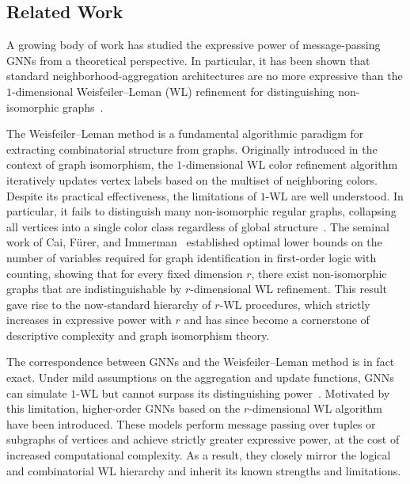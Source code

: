 
     
  

\subsection{Related Work}

A growing body of work has studied the expressive power of message-passing GNNs from a theoretical perspective. In particular, it has been shown that standard neighborhood-aggregation architectures are no more expressive than the $1$-dimensional Weisfeiler--Leman (WL) refinement for distinguishing non-isomorphic graphs~\cite{XuEtAl2019,MorrisEtAl2019}.

The Weisfeiler--Leman method is a fundamental algorithmic paradigm for extracting combinatorial structure from graphs. Originally introduced in the context of graph isomorphism, the $1$-dimensional WL color refinement algorithm iteratively updates vertex labels based on the multiset of neighboring colors. Despite its practical effectiveness, the limitations of $1$-WL are well understood. In particular, it fails to distinguish many non-isomorphic regular graphs, collapsing all vertices into a single color class regardless of global structure~\citep{WeisfeilerLehmanMethod,LowerBoundGraphIdentification}. The seminal work of Cai, Fürer, and Immerman~\citep{LowerBoundGraphIdentification} established optimal lower bounds on the number of variables required for graph identification in first-order logic with counting, showing that for every fixed dimension $r$, there exist non-isomorphic graphs that are indistinguishable by $r$-dimensional WL refinement. This result gave rise to the now-standard hierarchy of $r$-WL procedures, which strictly increases in expressive power with $r$ and has since become a cornerstone of descriptive complexity and graph isomorphism theory.

The correspondence between GNNs and the Weisfeiler--Leman method is in fact exact. Under mild assumptions on the aggregation and update functions, GNNs can simulate $1$-WL but cannot surpass its distinguishing power~\citep{XuEtAl2019,MorrisEtAl2019}. Motivated by this limitation, higher-order GNNs based on the $r$-dimensional WL algorithm have been introduced. These models perform message passing over tuples or subgraphs of vertices and achieve strictly greater expressive power, at the cost of increased computational complexity. As a result, they closely mirror the logical and combinatorial WL hierarchy and inherit its known strengths and limitations.

